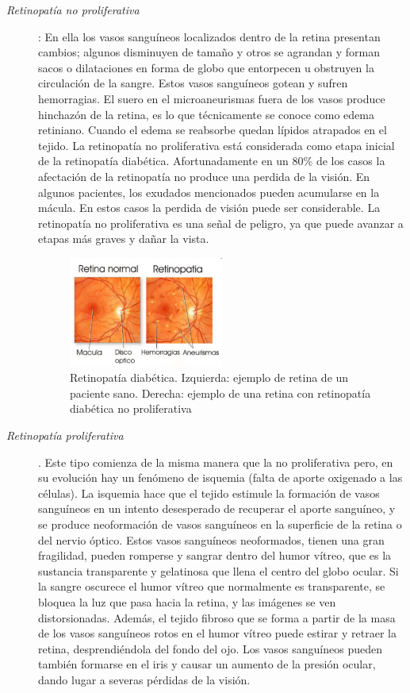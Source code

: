 \begin{description}
\begin{description}
	\item[\normalfont\textit{Retinopat\'ia no proliferativa}] : En ella los vasos sangu\'ineos localizados dentro de la retina presentan cambios; algunos disminuyen de tamaño y otros se agrandan y forman sacos o dilataciones en forma de globo que entorpecen u obstruyen la circulaci\'on de la sangre. Estos vasos sangu\'ineos gotean y sufren hemorragias. El suero en el microaneurismas fuera de los vasos produce hinchaz\'on de la retina, es lo que t\'ecnicamente se conoce como edema retiniano. Cuando el edema se reabsorbe quedan l\'ipidos atrapados en el tejido.
La retinopatía no proliferativa est\'a considerada como etapa inicial de la retinopat\'ia diab\'etica. Afortunadamente en un 80\% de los casos la afectaci\'on de la retinopatía no produce una perdida de la visi\'on. En algunos pacientes, los exudados mencionados pueden acumularse en la m\'acula. En estos casos la perdida de visi\'on puede ser considerable. La retinopat\'ia no proliferativa es una señal de peligro, ya que puede avanzar a etapas m\'as graves y dañar la vista. \cite{walter2002contribution} \cite{spencer1996image}
\begin{figure}[H]
	{
	\centering
	\includegraphics[width=0.5\textwidth]{Figures/Retinopatia}
	\caption[Retinopat\'ia]{Retinopat\'ia diab\'etica. Izquierda: ejemplo de retina de un paciente sano. Derecha: ejemplo de una retina con retinopat\'ia diab\'etica no proliferativa}
	\label{fig:Retinopatia}
	}
\end{figure}
\item[\normalfont\textit{ Retinopat\'ia proliferativa}]. Este tipo comienza de la misma manera que la no proliferativa pero, en su evoluci\'on hay un fen\'omeno de isquemia (falta de aporte oxigenado a las c\'elulas). La isquemia hace que el tejido estimule la formaci\'on de vasos sangu\'ineos en un intento desesperado de recuperar el aporte sangu\'ineo, y se produce neoformaci\'on de vasos sangu\'ineos en la superficie de la retina o del nervio \'optico. Estos vasos sangu\'ineos neoformados, tienen una gran fragilidad, pueden romperse y sangrar dentro del humor v\'itreo, que es la sustancia transparente y gelatinosa que llena el centro del globo ocular. Si la sangre oscurece el humor v\'itreo que normalmente es transparente, se bloquea la luz que pasa hacia la retina, y las im\'agenes se ven distorsionadas. Adem\'as, el tejido fibroso que se forma a partir de la masa de los vasos sangu\'ineos rotos en el humor v\'itreo puede estirar y retraer la retina, desprendi\'endola del fondo del ojo. Los vasos sangu\'ineos pueden tambi\'en formarse en el iris y causar un aumento de la presi\'on ocular, dando lugar a severas p\'erdidas de la visi\'on. \cite{walter2002contribution} \cite{spencer1996image}

\end{description}
\end{description}
